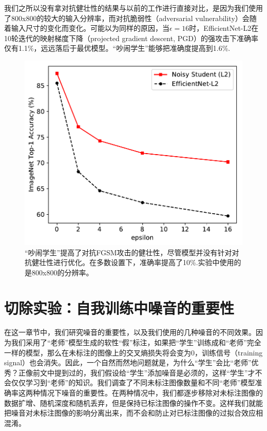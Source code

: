 \documentclass[10pt]{article}
\begin{document}
我们之所以没有拿对抗健壮性的结果与以前的工作进行直接对比，是因为我们使用了800x800的较大的输入分辨率，而对抗脆弱性（adversarial vulnerability）会随着输入尺寸的变化而变化\cite{galloway2019batch,goodfellow2014explaining,gilmer2018adversarial,simon2019first}。可能以为同样的原因，当$\epsilon=16$时，EfficientNet-L2在10轮迭代的映射梯度下降（projected gradient descent, PGD）\cite{madry2017towards}的强攻击下准确率仅有1.1\%，远远落后于最优模型。“吵闹学生”能够把准确度提高到1.6\%. 

\begin{figure}[h!]
	\centering
	\includegraphics[width=0.9\columnwidth]{fig/plot_adv}
	\caption{“吵闹学生”提高了对抗FGSM攻击的健壮性，尽管模型并没有针对对抗健壮性进行优化。在多数设置下，准确率提高了10\%.实验中使用的是800x800的分辨率。}
	\label{fig:adv_robustness}
	
\end{figure}

\section{切除实验：自我训练中噪音的重要性}
在这一章节中，我们研究噪音的重要性，以及我们使用的几种噪音的不同效果。因为我们采用了“老师”模型生成的软性“假”标注，如果把“学生”训练成和“老师”完全一样的模型，那么在未标注的图像上的交叉熵损失将会变为0，训练信号（training signal）也会消失。因此，一个自然而然地问题就是，为什么“学生”会比“老师”优秀？正像前文中提到过的，我们假设给“学生”添加噪音是必须的，这样“学生”才不会仅仅学习到“老师”的知识。我们调查了不同未标注图像数量和不同“老师”模型准确率这两种情况下噪音的重要性。在两种情况中，我们都逐步移除对未标注图像的数据扩增、随机深度和随机丢弃，但是保持已标注图像的操作不变。这样我们就能把噪音对未标注图像的影响分离出来，而不会和防止对已标注图像的过拟合效应相混淆。  
\end{document}
